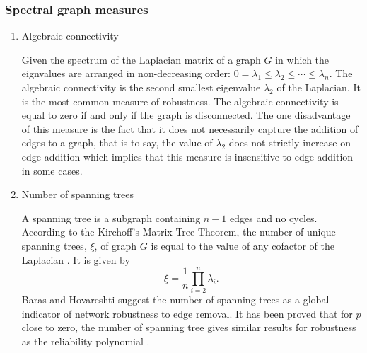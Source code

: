 \documentclass[10pt,a4paper]{article}
\theoremstyle{plain}
\theoremstyle{definition}
\begin{document}
	\subsubsection{Spectral graph measures}
	\begin{enumerate}
		\item Algebraic connectivity
		
		Given the spectrum of the Laplacian matrix of a graph $G$ in which the eignvalues are arranged in non-decreasing order: $0=\lambda_1\leq \lambda_2 \leq \cdots \leq \lambda_n$. The algebraic connectivity is the second smallest eigenvalue $\lambda_2$ of the Laplacian. It is the most common measure of robustness. The algebraic connectivity is equal to zero if and only if the graph is disconnected. The one disadvantage of this measure is the fact that it does not necessarily capture the addition of edges to a graph, that is to say, the value of $\lambda_2$ does not strictly increase on edge addition which implies that this measure is insensitive to edge addition in some cases.
		\item Number of spanning trees
				
		A spanning tree is a subgraph containing $n-1$ edges and no cycles. According to the Kirchoff's Matrix-Tree Theorem, the number of unique spanning trees, $\xi$, of graph $G$ is equal to the value of any cofactor of the Laplacian \citep{harris2008combinatorics}. It  is given by
		\begin{equation}
		\xi = \frac{1}{n} \prod_{i=2}^{n} \lambda_i.
		\end{equation}
		Baras and Hovareshti suggest the number of spanning trees as a global indicator of network robustness to edge removal. It has been proved that for $p$ close to zero, the number of spanning tree gives similar results for robustness as the reliability polynomial \citep{baras2009efficient}.
		

\end{enumerate}
\end{document}
